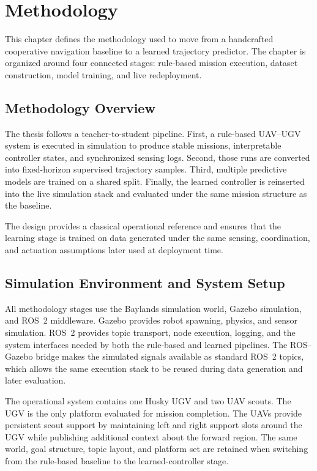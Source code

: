 
\chapter{Methodology}
\label{ch:methodology}

This chapter defines the methodology used to move from a handcrafted cooperative navigation baseline to a learned trajectory predictor. The chapter is organized around four connected stages: rule-based mission execution, dataset construction, model training, and live redeployment.

\section{Methodology Overview}

The thesis follows a teacher-to-student pipeline. First, a rule-based UAV--UGV system is executed in simulation to produce stable missions, interpretable controller states, and synchronized sensing logs. Second, those runs are converted into fixed-horizon supervised trajectory samples. Third, multiple predictive models are trained on a shared split. Finally, the learned controller is reinserted into the live simulation stack and evaluated under the same mission structure as the baseline.

The design provides a classical operational reference and ensures that the learning stage is trained on data generated under the same sensing, coordination, and actuation assumptions later used at deployment time.

\section{Simulation Environment and System Setup}

All methodology stages use the Baylands simulation world, Gazebo simulation, and ROS~2 middleware. Gazebo provides robot spawning, physics, and sensor simulation. ROS~2 provides topic transport, node execution, logging, and the system interfaces needed by both the rule-based and learned pipelines. The ROS--Gazebo bridge makes the simulated signals available as standard ROS~2 topics, which allows the same execution stack to be reused during data generation and later evaluation.

The operational system contains one Husky UGV and two UAV scouts. The UGV is the only platform evaluated for mission completion. The UAVs provide persistent scout support by maintaining left and right support slots around the UGV while publishing additional context about the forward region. The same world, goal structure, topic layout, and platform set are retained when switching from the rule-based baseline to the learned-controller stage.

